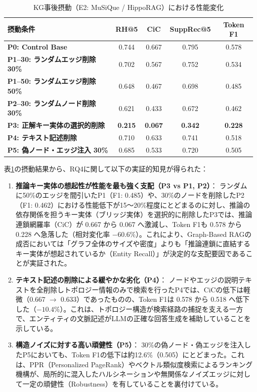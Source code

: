 \documentclass[a4j,dvipdfmx]{jsarticle}
\begin{document}
\begin{table}[t]
\centering
\caption{KG事後摂動（E2: MuSiQue / HippoRAG）における性能変化}
\label{tab:perturbation_results}
\small
\begin{tabular}{l|ccc|c}
\hline
\textbf{摂動条件} & \textbf{RH@5} & \textbf{CiC} & \textbf{SuppRec@5} & \textbf{Token F1} \\
\hline
\textbf{P0: Control Base} & 0.744 & 0.667 & 0.795 & 0.578 \\
\textbf{P1--30: ランダムエッジ削除 30\%} & 0.702 & 0.567 & 0.752 & 0.534 \\
\textbf{P1--50: ランダムエッジ削除 50\%} & 0.648 & 0.467 & 0.698 & 0.485 \\
\textbf{P2--30: ランダムノード削除 30\%} & 0.621 & 0.433 & 0.672 & 0.462 \\
\textbf{P3: 正解キー実体の選択的削除} & \textbf{0.215} & \textbf{0.067} & \textbf{0.342} & \textbf{0.228} \\
\textbf{P4: テキスト記述削除} & 0.710 & 0.633 & 0.741 & 0.518 \\
\textbf{P5: 偽ノード・エッジ注入 30\%} & 0.685 & 0.533 & 0.720 & 0.505 \\
\hline
\end{tabular}
\end{table}

表\ref{tab:perturbation_results}の摂動結果から、RQ4に関して以下の実証的知見が得られた：
\begin{enumerate}
    \item \textbf{推論キー実体の想起性が性能を最も強く支配（P3 vs P1, P2）}：
    ランダムに50\%のエッジを間引いたP1（F1: 0.485）や、30\%のノードを削除したP2（F1: 0.462）における性能低下が15〜20\%程度にとどまるのに対し、推論の依存関係を担うキー実体（ブリッジ実体）を選択的に削除したP3では、推論連鎖網羅率（CiC）が 0.667 から 0.067 へ激減し、Token F1も 0.578 から 0.228 へ急落した（相対変化率 $-60.6\%$）。これにより、Graph-Based RAGの成否においては「グラフ全体のサイズや密度」よりも「推論連鎖に直結するキー実体が想起されているか（Entity Recall）」が決定的な支配要因であることが実証された。
    \item \textbf{テキスト記述の削除による緩やかな劣化（P4）}：
    ノードやエッジの説明テキストを全削除しトポロジー情報のみで検索を行ったP4では、CiCの低下は軽微（0.667 $\to$ 0.633）であったものの、Token F1は 0.578 から 0.518 へ低下した（$-10.4\%$）。これは、トポロジー構造が検索経路の捕捉を支える一方で、エンティティの文脈記述がLLMの正確な回答生成を補助していることを示している。
    \item \textbf{構造ノイズに対する高い頑健性（P5）}：
    30\%の偽ノード・偽エッジを注入したP5においても、Token F1の低下は約12.6\%（0.505）にとどまった。これは、PPR（Personalized PageRank）やベクトル類似度検索によるランキング機構が、局所的に混入したハルシネーションや無関係なノイズエッジに対して一定の頑健性（Robustness）を有していることを裏付けている。
\end{enumerate}
\end{document}
